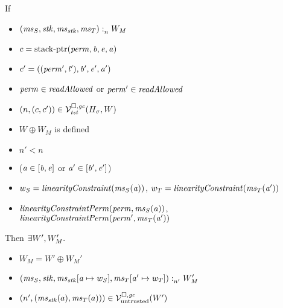 \documentclass[a4paper]{article}
\begin{document}
\begin{lemma}
  \label{lem:load-stack-cap-works}
  If
  \begin{itemize}
  \item $\memSat{(\ms_S,\stk,\ms_\stk,\ms_T)}{W_M}$
  \item $c = \stkptr{\perm,\baddr,\eaddr,\aaddr}$
  \item $c' = ((\perm',\lin'),\baddr',\eaddr',\aaddr')$
  \item $\perm \in \readAllowed{}$ or $\perm' \in \readAllowed{}$
  \item $\npair{(c,c')}\in\lrvg{\trust}(H_\sigma,W)$
  \item $W \oplus W_M$ is defined
  \item $n' < n$
  \item ($\aaddr \in [\baddr,\eaddr]$ or $\aaddr' \in [\baddr',\eaddr']$)
  \item $w_S = \linCons{\ms_S(\aaddr)}$, $w_T = \linCons{\ms_T(\aaddr')}$
  \item $\linConsPerm{\perm}{\ms_S(\aaddr)}$, $\linConsPerm{\perm'}{\ms_T(\aaddr')}$
  \end{itemize}
  Then $\exists W', W_M'\ldotp$
  \begin{itemize}
  \item $W_M = W' \oplus W_M'$
  \item $\memSat[n']{(\ms_S,\stk,\ms_\stk\update{\aaddr}{w_S},\ms_T\update{\aaddr'}{w_T})}{W_M'}$
  \item $\npair[n']{(\ms_\stk(a),\ms_T(a))} \in \lrv(W')$
  \end{itemize}
\end{lemma}
\end{document}
